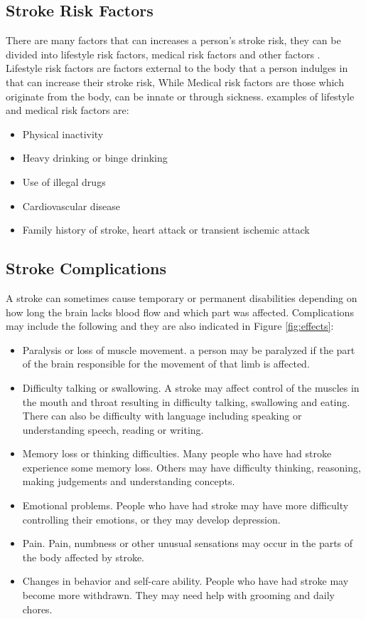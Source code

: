 \subsection{Stroke Risk Factors }
There are many factors that can increases a person’s stroke risk, they can be divided into lifestyle risk factors, medical risk factors and other factors \cite{mayostroke}.\\
Lifestyle risk factors are factors external to the body that a person indulges in that can increase their stroke risk, While Medical risk factors are those which originate from the body, can be innate or through sickness. examples of lifestyle and medical risk factors are:
\begin{itemize}%
	\item[] Physical inactivity
	\item[] Heavy drinking or binge drinking
	\item[] Use of illegal drugs
	\item[] Cardiovascular disease
	\item[] Family history of stroke, heart attack or transient ischemic attack 
\end{itemize}



\subsection{Stroke Complications}
A stroke can sometimes cause temporary or permanent disabilities depending on how long the brain lacks blood flow and which part was affected. Complications may include the following and they are also indicated in Figure \ref{fig:effects}:
\begin{itemize}%
	\item Paralysis or loss of muscle movement. a person may be paralyzed if the part of the brain responsible for the movement of that limb is affected.
	\item Difficulty talking or swallowing. A stroke may affect control of the muscles in the mouth and throat resulting in difficulty talking, swallowing and eating. There can also be difficulty with language including speaking or understanding speech, reading or writing.
	\item Memory loss or thinking difficulties. Many people who have had stroke experience some memory loss. Others may have difficulty thinking, reasoning, making judgements and understanding concepts.
	\item Emotional problems. People who have had stroke may have more difficulty controlling their emotions, or they may develop depression.
	\item Pain. Pain, numbness or other unusual sensations may occur in the parts of the body affected by stroke.
	\item Changes in behavior and self-care ability. People who have had stroke may become more withdrawn. They may need help with grooming and daily chores.
\end{itemize}

